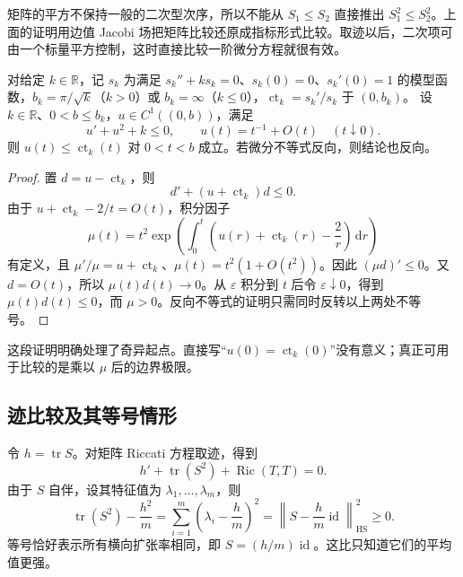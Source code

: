 矩阵的平方不保持一般的二次型次序，所以不能从 \(S_1\le S_2\) 直接推出 \(S_1^2\le S_2^2\)。上面的证明用边值 Jacobi 场把矩阵比较还原成指标形式比较。取迹以后，二次项可由一个标量平方控制，这时直接比较一阶微分方程就很有效。

\begin{lemma}\label{g3:lem:singular-scalar-riccati-comparison}
	对给定 \(k\in\mathbb R\)，记 \(s_k\) 为满足 \(s_k''+ks_k=0\)、\(s_k(0)=0\)、\(s_k'(0)=1\) 的模型函数，\(b_k=\pi/\sqrt k\)（\(k>0\)）或 \(b_k=\infty\)（\(k\le0\)），\(\operatorname{ct}_k=s_k'/s_k\) 于 \((0,b_k)\)。
	设 \(k\in\mathbb R\)、\(0<b\le b_k\)，\(u\in C^1((0,b))\)，满足
	\[
		u'+u^2+k\le0,\qquad u(t)=t^{-1}+O(t)\quad(t\downarrow0).
	\]
	则 \(u(t)\le\operatorname{ct}_k(t)\) 对 \(0<t<b\) 成立。若微分不等式反向，则结论也反向。
\end{lemma}
\begin{proof}
	置 \(d=u-\operatorname{ct}_k\)，则
	\[
		d'+(u+\operatorname{ct}_k)d\le0.
	\]
	由于 \(u+\operatorname{ct}_k-2/t=O(t)\)，积分因子
	\[
		\mu(t)=t^2\exp\left(\int_0^t\left(u(r)+\operatorname{ct}_k(r)-\frac2r\right)\,\mathrm dr\right)
	\]
	有定义，且 \(\mu'/\mu=u+\operatorname{ct}_k\)、\(\mu(t)=t^2(1+O(t^2))\)。因此 \((\mu d)'\le0\)。又 \(d=O(t)\)，所以 \(\mu(t)d(t)\to0\)。从 \(\varepsilon\) 积分到 \(t\) 后令 \(\varepsilon\downarrow0\)，得到 \(\mu(t)d(t)\le0\)，而 \(\mu>0\)。反向不等式的证明只需同时反转以上两处不等号。
\end{proof}

这段证明明确处理了奇异起点。直接写“\(u(0)=\operatorname{ct}_k(0)\)”没有意义；真正可用于比较的是乘以 \(\mu\) 后的边界极限。

\subsection{迹比较及其等号情形}
\label{g3:subsec:0702:03}

令 \(h=\operatorname{tr}S\)。对矩阵 Riccati 方程取迹，得到
\begin{equation}\label{g3:eq:riccati-trace-equation}
	h'+\operatorname{tr}(S^2)+\operatorname{Ric}(T,T)=0.
\end{equation}
由于 \(S\) 自伴，设其特征值为 \(\lambda_1,\ldots,\lambda_m\)，则
\begin{equation}\label{g3:eq:riccati-trace-cauchy-schwarz}
	\operatorname{tr}(S^2)-\frac{h^2}{m}
	=\sum_{i=1}^m\left(\lambda_i-\frac hm\right)^2
	=\left\lVert S-\frac hm\operatorname{id}\right\rVert_{\mathrm{HS}}^2\ge0.
\end{equation}
等号恰好表示所有横向扩张率相同，即 \(S=(h/m)\operatorname{id}\)。这比只知道它们的平均值更强。


